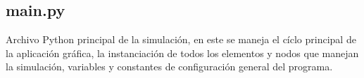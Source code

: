 \documentclass[]{article}
\begin{document}
			
			
	\subsection{main.py}
		Archivo Python principal de la simulación, en este se maneja el cíclo principal de la aplicación gráfica, la instanciación de todos los elementos y nodos que manejan la simulación, variables y constantes de configuración general del programa.
		
		
\end{document}
